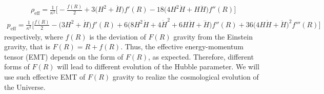 \documentclass{article}
\begin{document}
\begin{eqnarray}
 \rho_\mathrm{eff} = \frac{1}{\kappa^2}\bigg[-\frac{f(R)}{2} + 3\big(H^2 + \dot{H}\big)f'(R) - 18\big(4H^2\dot{H} + H\ddot{H}\big)f''(R)\bigg]
 \label{ed}
\end{eqnarray}
\begin{eqnarray}
 p_\mathrm{eff} = \frac{1}{\kappa^2}\bigg[\frac{f(R)}{2} - \big(3H^2 + \dot{H}\big)f'(R) + 6\big(8H^2\dot{H} + 4\dot{H}^2 + 6H\ddot{H}
+ \dddot{H}\big)f''(R) + 36\big(4H\dot{H} + \ddot{H}\big)^2f'''(R)\bigg]
\label{pressure}
\end{eqnarray}
respectively, where $f(R)$ is the deviation of $F(R)$ gravity from the 
Einstein gravity, that is $F(R) = R + f(R)$. Thus, the effective energy-momentum tensor (EMT)
depends on the form of $F(R)$, as expected. Therefore, different 
forms of $F(R)$ will lead to different evolution of the Hubble parameter. We will use such effective EMT 
of $F(R)$ gravity to realize the cosmological evolution of the Universe.\\
\end{document}
